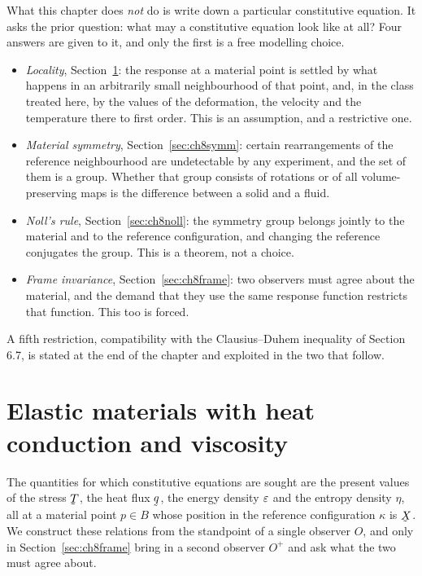 What this chapter does \emph{not} do is write down a particular
constitutive equation. It asks the prior question: what may a
constitutive equation look like at all? Four answers are given to it,
and only the first is a free modelling choice.

\begin{itemize}\itemsep2pt
\item \emph{Locality}, Section~\ref{sec:ch8elastic}: the response at a
      material point is settled by what happens in an arbitrarily small
      neighbourhood of that point, and, in the class treated here, by
      the values of the deformation, the velocity and the temperature
      there to first order. This is an assumption, and a restrictive
      one.
\item \emph{Material symmetry}, Section~\ref{sec:ch8symm}: certain
      rearrangements of the reference neighbourhood are undetectable by
      any experiment, and the set of them is a group. Whether that group
      consists of rotations or of all volume-preserving maps is the
      difference between a solid and a fluid.
\item \emph{Noll's rule}, Section~\ref{sec:ch8noll}: the symmetry group
      belongs jointly to the material and to the reference
      configuration, and changing the reference conjugates the group.
      This is a theorem, not a choice.
\item \emph{Frame invariance}, Section~\ref{sec:ch8frame}: two observers
      must agree about the material, and the demand that they use the
      same response function restricts that function. This too is
      forced.
\end{itemize}

A fifth restriction, compatibility with the Clausius--Duhem inequality
of Section 6.7, is stated at the end of the chapter and exploited in the
two that follow.

\section{Elastic materials with heat conduction and viscosity}
\label{sec:ch8elastic}

The quantities for which constitutive equations are sought are the
present values of the stress $\bT$, the heat flux $\bq$, the energy
density $\varepsilon$ and the entropy density $\eta$, all at a material point
$p\in B$ whose position in the reference configuration $\kappa$ is
$\bX$. We construct these relations from the standpoint of a single
observer $O$, and only in Section~\ref{sec:ch8frame} bring in a second
observer $O^{+}$ and ask what the two must agree about.

